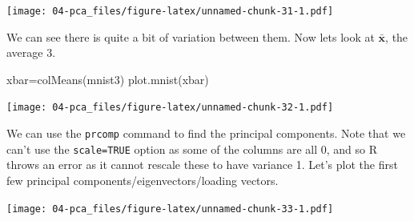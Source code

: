 \documentclass[
]{book}
\newenvironment{Shaded}{\begin{snugshade}}{\end{snugshade}}
\newcommand{\AttributeTok}[1]{\textcolor[rgb]{0.77,0.63,0.00}{#1}}
\newcommand{\CommentTok}[1]{\textcolor[rgb]{0.56,0.35,0.01}{\textit{#1}}}
\newcommand{\DecValTok}[1]{\textcolor[rgb]{0.00,0.00,0.81}{#1}}
\newcommand{\FunctionTok}[1]{\textcolor[rgb]{0.00,0.00,0.00}{#1}}
\newcommand{\NormalTok}[1]{#1}
\newcommand{\OtherTok}[1]{\textcolor[rgb]{0.56,0.35,0.01}{#1}}
\newcommand{\SpecialCharTok}[1]{\textcolor[rgb]{0.00,0.00,0.00}{#1}}
\newcommand{\StringTok}[1]{\textcolor[rgb]{0.31,0.60,0.02}{#1}}
\theoremstyle{definition}
\theoremstyle{definition}
\theoremstyle{definition}
\theoremstyle{definition}
\theoremstyle{remark}
\begin{document}
\begin{Shaded}
\end{Shaded}

\texttt{[image: 04-pca\_files/figure-latex/unnamed-chunk-31-1.pdf]}

We can see there is quite a bit of variation between them.
Now lets look at \(\bar{\mathbf x}\), the average 3.

\begin{Shaded}
\begin{Highlighting}[]
\NormalTok{xbar}\OtherTok{=}\FunctionTok{colMeans}\NormalTok{(mnist3)}
\FunctionTok{plot.mnist}\NormalTok{(xbar)}
\end{Highlighting}
\end{Shaded}

\texttt{[image: 04-pca\_files/figure-latex/unnamed-chunk-32-1.pdf]}

We can use the \texttt{prcomp} command to find the principal components. Note that we can't use the \texttt{scale=TRUE} option as some of the columns are all 0, and so R throws an error as it cannot rescale these to have variance 1. Let's plot the first few principal components/eigenvectors/loading vectors.

\begin{Shaded}
\end{Shaded}

\texttt{[image: 04-pca\_files/figure-latex/unnamed-chunk-33-1.pdf]}
\end{document}
